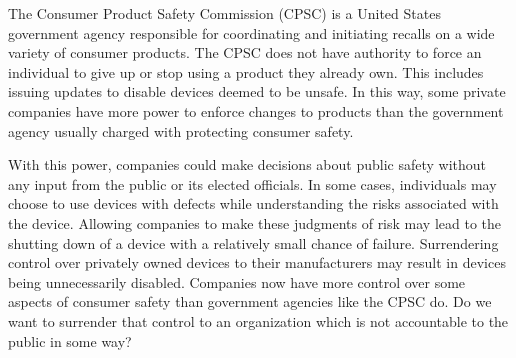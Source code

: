 \documentclass[12pt]{article}
\begin{document}
	The Consumer Product Safety Commission (CPSC) is a United States government agency responsible for coordinating and initiating recalls on a wide variety of consumer products\cite{CPSCFAQ}. The CPSC does not have authority to force an individual to give up or stop using a product they already own\cite{CPSCFAQ}. This includes issuing updates to disable devices deemed to be unsafe. In this way, some private companies have more power to enforce changes to products than the government agency usually charged with protecting consumer safety.
    
	With this power, companies could make decisions about public safety without any input from the public or its elected officials. In some cases, individuals may choose to use devices with defects while understanding the risks associated with the device\cite{safetyStandardsBook}. Allowing companies to make these judgments of risk may lead to the shutting down of a device with a relatively small chance of failure. Surrendering control over privately owned devices to their manufacturers may result in devices being unnecessarily disabled. Companies now have more control over some aspects of consumer safety than government agencies like the CPSC do. Do we want to surrender that control to an organization which is not accountable to the public in some way?
	
	
		

\end{document}
